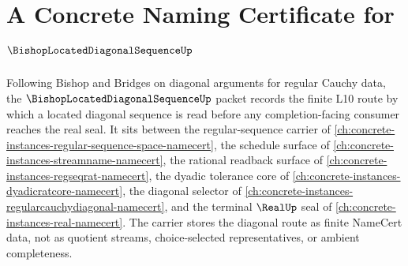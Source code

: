 \chapter{A Concrete Naming Certificate for $\BishopLocatedDiagonalSequenceUp$}
\label{ch:concrete-instances-bishop-located-diagonal-sequence-namecert}

Following Bishop and Bridges on diagonal arguments for regular Cauchy data, the $\BishopLocatedDiagonalSequenceUp$ packet records the finite L10 route by which a located diagonal sequence is read before any completion-facing consumer reaches the real seal. It sits between the regular-sequence carrier of \autoref{ch:concrete-instances-regular-sequence-space-namecert}, the schedule surface of \autoref{ch:concrete-instances-streamname-namecert}, the rational readback surface of \autoref{ch:concrete-instances-regseqrat-namecert}, the dyadic tolerance core of \autoref{ch:concrete-instances-dyadicratcore-namecert}, the diagonal selector of \autoref{ch:concrete-instances-regularcauchydiagonal-namecert}, and the terminal $\RealUp$ seal of \autoref{ch:concrete-instances-real-namecert}. The carrier stores the diagonal route as finite NameCert data, not as quotient streams, choice-selected representatives, or ambient completeness.

